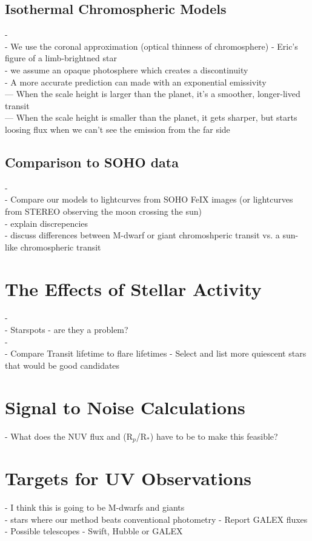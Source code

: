 \documentclass[manuscript]{aastex}
\begin{document}
\subsection{Isothermal Chromospheric Models}
- \\
- We use the coronal approximation (optical thinness of chromosphere)
- Eric's figure of a limb-brightned star \\
 - we assume an opaque photosphere which creates a discontinuity \\
- A more accurate prediction can made with an exponential emissivity \\
--- When the scale height is larger than the planet, it's a smoother, longer-lived transit \\
--- When the scale height is smaller than the planet, it gets sharper, but starts loosing flux when we can't see the emission from the far side \\


\subsection{Comparison to SOHO data}
-\\
- Compare our models to lightcurves from SOHO FeIX images
 (or lightcurves from STEREO observing the moon crossing the sun) \\
- explain discrepencies\\
- discuss differences between M-dwarf or giant chromoshperic transit
vs. a sun-like chromospheric transit \\

\section{The Effects of Stellar Activity}
-\\
-    Starspots - are they a problem? \\
-\\
-    Compare Transit lifetime to flare lifetimes
-  Select and list more quiescent stars that would be good candidates

\section{Signal to Noise Calculations}
- What does the NUV flux and (R$_p$/R$_*$) have to be to make this feasible?

\section{Targets for UV Observations}
- I think this is going to be M-dwarfs and giants \\
- stars where our method beats conventional photometry
-      Report GALEX fluxes \\
-   Possible telescopes - Swift, Hubble or GALEX \\
\end{document}

